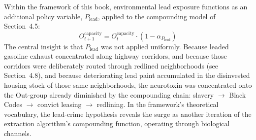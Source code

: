 Within the framework of this book, environmental lead exposure functions as an additional policy variable, \(P_{\text{lead}}\), applied to the compounding model of Section~4.5:
\begin{equation}\label{eq:9.1-lead-crime-compounding}
O_{t+1}^{\text{capacity}} = O_t^{\text{capacity}} \cdot (1 - \alpha_{P_{\text{lead}}})
\end{equation}
The central insight is that $P_{\text{lead}}$ was not applied uniformly. Because leaded gasoline exhaust concentrated along highway corridors, and because those corridors were deliberately routed through redlined neighborhoods (see Section~4.8), and because deteriorating lead paint accumulated in the disinvested housing stock of those same neighborhoods, the neurotoxin was concentrated onto the Out-group already diminished by the compounding chain: slavery $\rightarrow$ Black Codes $\rightarrow$ convict leasing $\rightarrow$ redlining. In the framework's theoretical vocabulary, the lead-crime hypothesis reveals the surge as another iteration of the extraction algorithm's compounding function, operating through biological channels.

